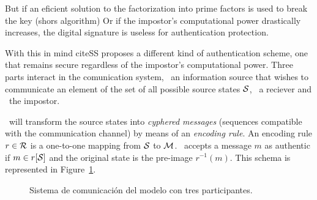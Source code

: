 \documentclass[conference]{IEEEtran}
\begin{document}
But if an eficient solution to the factorization into prime factors is used to break the key (shors algorithm) %
Or if the impostor's computational power drastically increases, the digital signature is useless for authentication protection.

With this in mind cite{SS} proposes a different kind of authentication scheme, one that remains secure regardless of the impostor's computational power. Three parts interact in the comunication system, \A\ an information source that wishes to communicate an element of the set of all possible source states $\mathcal S$, \B\ a reciever and \E\ the impostor.

\A\ will transform the source states into \textit{cyphered messages} (sequences compatible with the communication channel) by means of an \textit{encoding rule}. An encoding rule $r\in\mathcal R$ is a one-to-one mapping from $\mathcal S$ to $\mathcal M$. \B\ accepts a message $m$ as authentic if $m\in r[\mathcal S]$ and the original state is the pre-image $r^{-1}(m)$. This schema is represented in Figure~\ref{figModelo3Participantes}.

\begin{figure}
    \centering
    \caption{Sistema de comunicación del modelo con tres participantes.}
    \label{figModelo3Participantes}
\end{figure}
\end{document}
